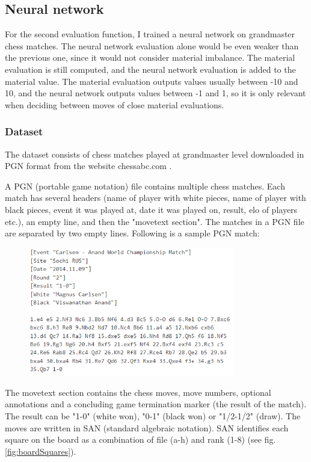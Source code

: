 \subsection{Neural network}
\label{subsec:ch4sec3subsec2}

For the second evaluation function, I trained a neural network on grandmaster chess matches. The neural network evaluation alone would be even weaker than the previous one, since it would not consider material imbalance. The material evaluation is still computed, and the neural network evaluation is added to the material value. The material evaluation outputs values usually between -10 and 10, and the neural network outputs values between -1 and 1, so it is only relevant when deciding between moves of close material evaluations.

\subsubsection{Dataset}
\label{subsec:ch4sec3subsec2subsubsec1}

The dataset consists of chess matches played at grandmaster level downloaded in PGN format from the website chessabc.com \cite{chessabc}.

A PGN (portable game notation) file contains multiple chess matches. Each match has several headers (name of player with white pieces, name of player with black pieces, event it was played at, date it was played on, result, elo of players etc.), an empty line, and then the "movetext section". The matches in a PGN file are separated by two empty lines. Following is a sample PGN match:
\begin{figure}[h]
    \includegraphics[width=0.8\textwidth]{figures/carlsen-anand-match.png}
\end{figure}

The movetext section contains the chess moves, move numbers, optional annotations and a concluding game termination marker (the result of the match). The result can be "1-0" (white won), "0-1" (black won) or "1/2-1/2" (draw). The moves are written in SAN (standard algebraic notation). SAN identifies each square on the board as a combination of file (a-h) and rank (1-8) (see fig. \ref{fig:boardSquares}).

